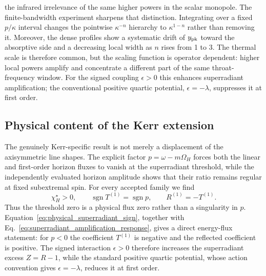 \documentclass[aps,prd,twocolumn,10pt,nofootinbib,superscriptaddress,floatfix]{revtex4-2}
\begin{document}
the infrared irrelevance of the same higher powers in the scalar monopole.
The finite-bandwidth experiment sharpens that distinction.  Integrating over
a fixed $p/\kappa$ interval changes the pointwise $\kappa^{-n}$ hierarchy to
$\kappa^{1-n}$ rather than removing it.  Moreover, the dense profiles show a
systematic drift of $y_{\rm pk}$ toward the absorptive side and a decreasing
local width as $n$ rises from 1 to 3.  The thermal scale is therefore common,
but the scaling function is operator dependent: higher local powers amplify
and concentrate a different part of the same throat-frequency window.
For the signed coupling $\epsilon>0$ this enhances superradiant amplification;
the conventional positive quartic potential, $\epsilon=-\lambda$, suppresses
it at first order.

\subsection{Physical content of the Kerr extension}

The genuinely Kerr-specific result is not merely a displacement of the
axisymmetric line shapes.  The explicit factor
$p=\omega-m\Omega_H$ forces both the linear and first-order horizon fluxes to
vanish at the superradiant threshold, while the independently evaluated
horizon amplitude shows that their ratio remains regular at fixed
subextremal spin.  For every accepted family we find
\begin{equation}
\chi_H^\star>0,\qquad
\operatorname{sgn}T^{(1)}=\operatorname{sgn}p,\qquad
R^{(1)}=-T^{(1)}.
\label{eq:physical_superradiant_sign}
\end{equation}
Thus the threshold zero is a physical flux zero rather than a singularity in
$p$.  Equation~\eqref{eq:physical_superradiant_sign}, together with
Eq.~\eqref{eq:superradiant_amplification_response}, gives a direct energy-flux
statement: for $p<0$ the coefficient $T^{(1)}$ is negative and the reflected
coefficient is positive.  The signed interaction $\epsilon>0$ therefore
increases the superradiant excess $Z=R-1$, while the standard positive quartic
potential, whose action convention gives $\epsilon=-\lambda$, reduces it at
first order.
\end{document}
